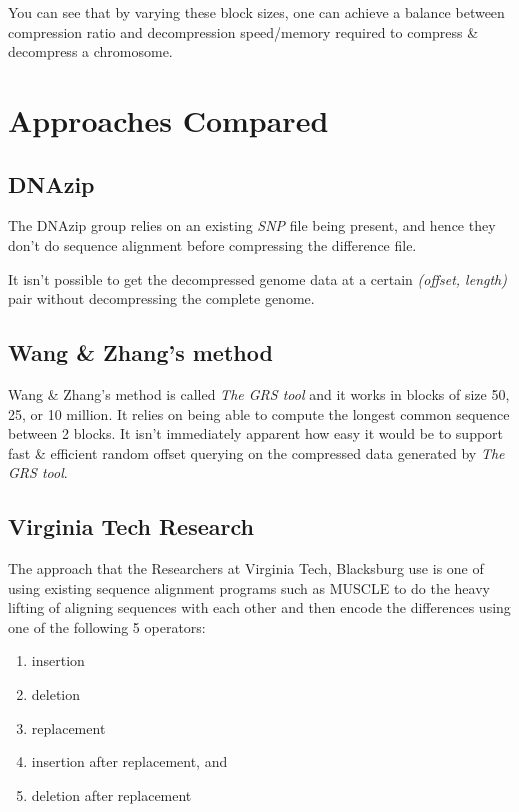 \documentclass[11pt]{article}
\begin{document}
You can see that by varying these block sizes, one can achieve a
balance between compression ratio and decompression speed/memory
required to compress \& decompress a chromosome.


\section{Approaches Compared}

\subsection{DNAzip}

The DNAzip group relies on an existing \textit{SNP} file being
present, and hence they don't do sequence alignment before compressing
the difference file.

It isn't possible to get the decompressed genome data at a certain
\textit{(offset, length)} pair without decompressing the complete
genome.

\subsection{Wang \& Zhang's method}

Wang \& Zhang's method is called \textit{The GRS tool} and it works in
blocks of size 50, 25, or 10 million. It relies on being able to
compute the longest common sequence between 2 blocks. It isn't
immediately apparent how easy it would be to support fast \& efficient
random offset querying on the compressed data generated by \textit{The
  GRS tool}.

\subsection{Virginia Tech Research}

The approach that the Researchers at Virginia Tech,
Blacksburg\cite{vtechresearch} use is one of using existing sequence
alignment programs such as MUSCLE\cite{muscle} to do the heavy lifting
of aligning sequences with each other and then encode the differences
using one of the following 5 operators:
\begin{enumerate}
\item insertion
\item deletion
\item replacement
\item insertion after replacement, and
\item deletion after replacement
\end{enumerate}
\end{document}
